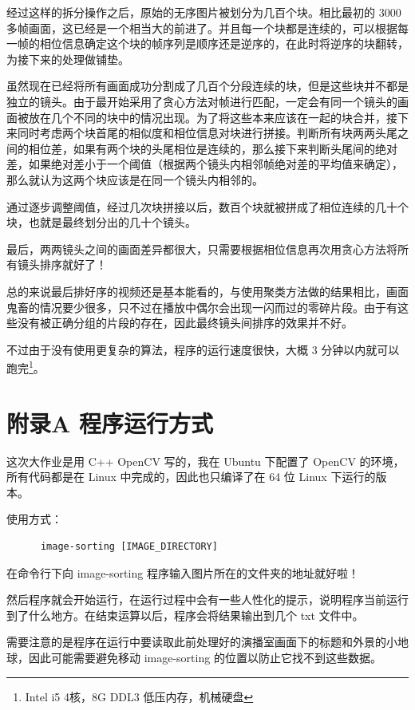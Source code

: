 \documentclass[a4paper, fontset=none]{article}
\begin{document}
经过这样的拆分操作之后，原始的无序图片被划分为几百个块。相比最初的 3000 多帧画面，这已经是一个相当大的前进了。并且每一个块都是连续的，可以根据每一帧的相位信息确定这个块的帧序列是顺序还是逆序的，在此时将逆序的块翻转，为接下来的处理做铺垫。

虽然现在已经将所有画面成功分割成了几百个分段连续的块，但是这些块并不都是独立的镜头。由于最开始采用了贪心方法对帧进行匹配，一定会有同一个镜头的画面被放在几个不同的块中的情况出现。为了将这些本来应该在一起的块合并，接下来同时考虑两个块首尾的相似度和相位信息对块进行拼接。判断所有块两两头尾之间的相位差，如果有两个块的头尾相位是连续的，那么接下来判断头尾间的绝对差，如果绝对差小于一个阈值（根据两个镜头内相邻帧绝对差的平均值来确定），那么就认为这两个块应该是在同一个镜头内相邻的。

通过逐步调整阈值，经过几次块拼接以后，数百个块就被拼成了相位连续的几十个块，也就是最终划分出的几十个镜头。

最后，两两镜头之间的画面差异都很大，只需要根据相位信息再次用贪心方法将所有镜头排序就好了！

总的来说最后排好序的视频还是基本能看的，与使用聚类方法做的结果相比，画面鬼畜的情况要少很多，只不过在播放中偶尔会出现一闪而过的零碎片段。由于有这些没有被正确分组的片段的存在，因此最终镜头间排序的效果并不好。

不过由于没有使用更复杂的算法，程序的运行速度很快，大概 3 分钟以内就可以跑完\footnote{Intel i5 4核，8G DDL3 低压内存，机械硬盘}。

\section*{附录A 程序运行方式}
\label{sec:程序运行方式}

这次大作业是用 C++ OpenCV 写的，我在 Ubuntu 下配置了 OpenCV 的环境，所有代码都是在 Linux 中完成的，因此也只编译了在 64 位 Linux 下运行的版本。

使用方式：

\begin{verbatim}
      image-sorting [IMAGE_DIRECTORY]
\end{verbatim}

在命令行下向 image-sorting 程序输入图片所在的文件夹的地址就好啦！

然后程序就会开始运行，在运行过程中会有一些人性化的提示，说明程序当前运行到了什么地方。在结束运算以后，程序会将结果输出到几个 txt 文件中。

需要注意的是程序在运行中要读取此前处理好的演播室画面下的标题和外景的小地球，因此可能需要避免移动 image-sorting 的位置以防止它找不到这些数据。
\end{document}
